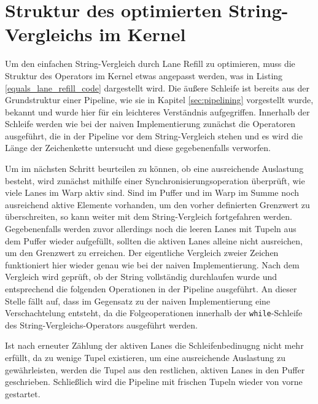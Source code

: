 \section{Struktur des optimierten String-Vergleichs im Kernel}

Um den einfachen String-Vergleich durch Lane Refill zu optimieren, muss die Struktur des Operators im Kernel etwas angepasst werden, was in Listing \ref{equals_lane_refill_code} dargestellt wird.
Die äußere Schleife ist bereits aus der Grundstruktur einer Pipeline, wie sie in Kapitel \ref{sec:pipelining} vorgestellt wurde, bekannt und wurde hier für ein leichteres Verständnis aufgegriffen.
Innerhalb der Schleife werden wie bei der naiven Implementierung zunächst die Operatoren ausgeführt, die in der Pipeline vor dem String-Vergleich stehen und es wird die Länge der Zeichenkette untersucht und diese gegebenenfalls verworfen.

Um im nächsten Schritt beurteilen zu können, ob eine ausreichende Auslastung besteht, wird zunächst mithilfe einer Synchronisierungsoperation überprüft, wie viele Lanes im Warp aktiv sind.
Sind im Puffer und im Warp im Summe noch ausreichend aktive Elemente vorhanden, um den vorher definierten Grenzwert zu überschreiten, so kann weiter mit dem String-Vergleich fortgefahren werden.
Gegebenenfalls werden zuvor allerdings noch die leeren Lanes mit Tupeln aus dem Puffer wieder aufgefüllt, sollten die aktiven Lanes alleine nicht ausreichen, um den Grenzwert zu erreichen.
Der eigentliche Vergleich zweier Zeichen funktioniert hier wieder genau wie bei der naiven Implementierung.
Nach dem Vergleich wird geprüft, ob der String vollständig durchlaufen wurde und entsprechend die folgenden Operationen in der Pipeline ausgeführt.
An dieser Stelle fällt auf, dass im Gegensatz zu der naiven Implementierung eine Verschachtelung entsteht, da die Folgeoperationen innerhalb der \texttt{while}-Schleife des String-Vergleichs-Operators ausgeführt werden.

Ist nach erneuter Zählung der aktiven Lanes die Schleifenbedinugng nicht mehr erfüllt, da zu wenige Tupel existieren, um eine ausreichende Auslastung zu gewährleisten, werden die Tupel aus den restlichen, aktiven Lanes in den Puffer geschrieben.
Schließlich wird die Pipeline mit frischen Tupeln wieder von vorne gestartet.

\newpage


